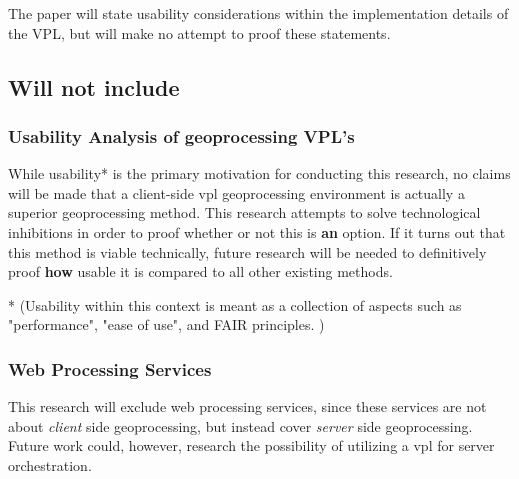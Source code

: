 The paper will state usability considerations within the implementation details of the VPL, but will make no attempt to proof these statements. 

\subsection{Will not include}



\subsubsection*{Usability Analysis of geoprocessing VPL's}

While usability* is the primary motivation for conducting this research, no claims will be made that a client-side vpl geoprocessing environment is actually a superior geoprocessing method. This research attempts to solve technological inhibitions in order to proof whether or not this is \textbf{an} option. If it turns out that this method is viable technically, future research will be needed to definitively proof \textbf{how} usable it is compared to all other existing methods.  

* (Usability within this context is meant as a collection of aspects such as "performance", "ease of use", and FAIR principles. )

\subsubsection*{Web Processing Services}
This research will exclude web processing services, since these services are not about \emph{client} side geoprocessing, but instead cover \emph{server} side geoprocessing. 
Future work could, however, research the possibility of utilizing a vpl for server orchestration. 


